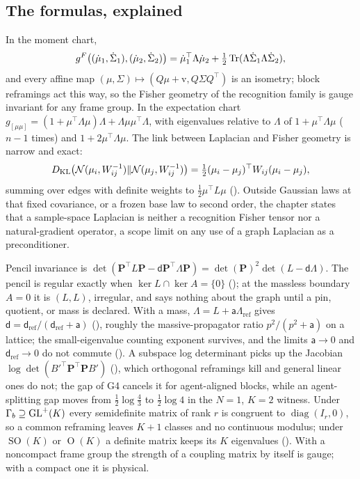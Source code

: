 \subsection{The formulas, explained}

In the moment chart,
\[
g^F\bigl((\dot\mu_1,\dot\Sigma_1),(\dot\mu_2,\dot\Sigma_2)\bigr)=\dot\mu_1^\top\Lambda\dot\mu_2+\tfrac12\operatorname{Tr}(\Lambda\dot\Sigma_1\Lambda\dot\Sigma_2),
\]
and every affine map \((\mu,\Sigma)\mapsto(Q\mu+\mathrm v,Q\Sigma Q^\top)\) is an isometry; block
reframings act this way, so the Fisher geometry of the recognition family is gauge invariant for any
frame group. In the expectation chart
\(g_{[\mu\mu]}=(1+\mu^\top\Lambda\mu)\Lambda+\Lambda\mu\mu^\top\Lambda\), with eigenvalues relative to
\(\Lambda\) of \(1+\mu^\top\Lambda\mu\) (\(n-1\) times) and \(1+2\mu^\top\Lambda\mu\). The link between
Laplacian and Fisher geometry is narrow and exact:
\[
D_{\mathrm{KL}}\bigl(\mathcal N(\mu_i,W_{ij}^{-1})\Vert\mathcal N(\mu_j,W_{ij}^{-1})\bigr)=\tfrac12(\mu_i-\mu_j)^\top W_{ij}(\mu_i-\mu_j),
\]
summing over edges with definite weights to \(\tfrac12\mu^\top L\mu\) ().
Outside Gaussian laws at that fixed covariance, or a frozen base law to second order, the chapter states
that a sample-space Laplacian is neither a recognition Fisher tensor nor a natural-gradient operator, a
scope limit on any use of a graph Laplacian as a preconditioner.

Pencil invariance is
\(\det(\mathbf P^\top L\mathbf P-\mathsf d\mathbf P^\top\Lambda\mathbf P)=\det(\mathbf P)^2\det(L-\mathsf d\Lambda)\).
The pencil is regular exactly when \(\ker L\cap\ker A=\{0\}\) (); at the
massless boundary \(A=0\) it is \((L,L)\), irregular, and says nothing about the graph until a pin,
quotient, or mass is declared. With a mass, \(\Lambda=L+\mathsf a\Lambda_{\mathrm{ref}}\) gives
\(\mathsf d=\mathsf d_{\mathrm{ref}}/(\mathsf d_{\mathrm{ref}}+\mathsf a)\)
(), roughly the massive-propagator ratio \(p^2/(p^2+\mathsf a)\) on a
lattice; the small-eigenvalue counting exponent survives, and the limits \(\mathsf a\to0\) and
\(\mathsf d_{\mathrm{ref}}\to0\) do not commute (). A subspace log
determinant picks up the Jacobian \(\log\det(B'^\top\mathbf P^\top\mathbf PB')\) (),
which orthogonal reframings kill and general linear ones do not; the gap of G4 cancels it for
agent-aligned blocks, while an agent-splitting gap moves from \(\tfrac12\log\tfrac43\) to
\(\tfrac12\log4\) in the \(N=1\), \(K=2\) witness. Under \(\Gamma_b\supseteq\mathrm{GL}^+(K)\) every semidefinite
matrix of rank \(r\) is congruent to \(\operatorname{diag}(I_r,0)\), so a common reframing leaves \(K+1\)
classes and no continuous modulus; under \(\operatorname{SO}(K)\) or \(\operatorname{O}(K)\) a definite
matrix keeps its \(K\) eigenvalues (). With a noncompact frame group the
strength of a coupling matrix by itself is gauge; with a compact one it is physical.

